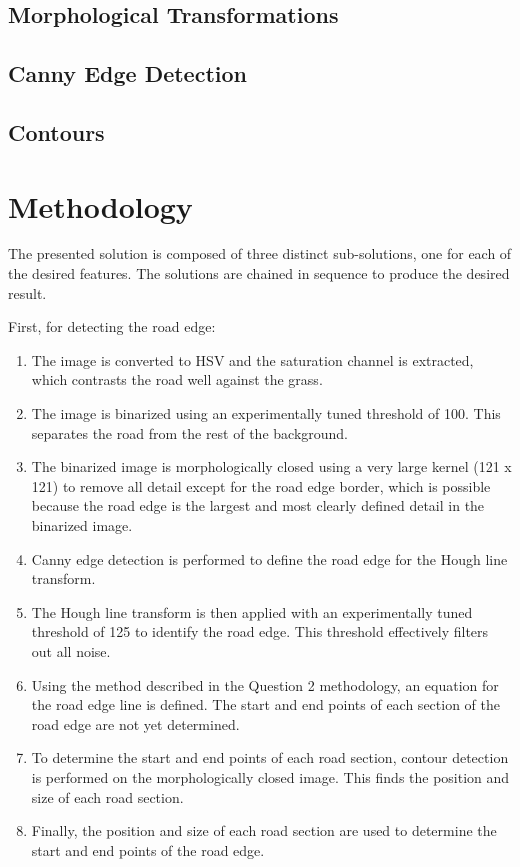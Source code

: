 \subsection{Morphological Transformations}

\subsection{Canny Edge Detection}

\subsection{Contours}

\section{Methodology}

The presented solution is composed of three distinct sub-solutions, one for each of the desired features. The solutions are chained in sequence to produce the desired result.

First, for detecting the road edge:
\begin{enumerate}
  \item The image is converted to HSV and the saturation channel is extracted, which contrasts the road well against the grass.

  \item The image is binarized using an experimentally tuned threshold of 100. This separates the road from the rest of the background.

  \item The binarized image is morphologically closed using a very large kernel (121 x 121) to remove all detail except for the road edge border, which is possible because the road edge is the largest and most clearly defined detail in the binarized image.

  \item Canny edge detection is performed to define the road edge for the Hough line transform.

  \item The Hough line transform is then applied with an experimentally tuned threshold of 125 to identify the road edge. This threshold effectively filters out all noise.

  \item Using the method described in the Question 2 methodology, an equation for the road edge line is defined. The start and end points of each section of the road edge are not yet determined.

  \item To determine the start and end points of each road section, contour detection is performed on the morphologically closed image. This finds the position and size of each road section.

  \item Finally, the position and size of each road section are used to determine the start and end points of the road edge.

\end{enumerate}

